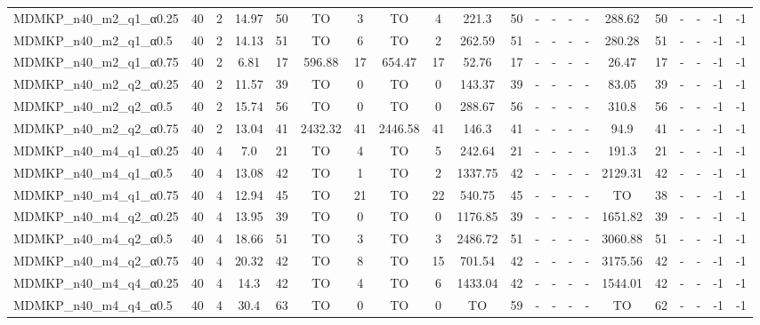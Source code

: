 \begin{sidewaystable}[!ht]
{\begin{tabular}{lcccccccccccccccccccc}
MDMKP\_n40\_m2\_q1\_α0.25 & 40 & 2 &  \textcolor{blue2}{14.97} & 50 & TO & 3 & TO & 4 & 221.3 & 50 &  - &  - &  - &  - & 288.62 & 50 &  - &  - & -1 & -1 \\
MDMKP\_n40\_m2\_q1\_α0.5 & 40 & 2 &  \textcolor{blue2}{14.13} & 51 & TO & 6 & TO & 2 & 262.59 & 51 &  - &  - &  - &  - & 280.28 & 51 &  - &  - & -1 & -1 \\
MDMKP\_n40\_m2\_q1\_α0.75 & 40 & 2 &  \textcolor{blue2}{6.81} & 17 & 596.88 & 17 & 654.47 & 17 & 52.76 & 17 &  - &  - &  - &  - & 26.47 & 17 &  - &  - & -1 & -1 \\
MDMKP\_n40\_m2\_q2\_α0.25 & 40 & 2 &  \textcolor{blue2}{11.57} & 39 & TO & 0 & TO & 0 & 143.37 & 39 &  - &  - &  - &  - & 83.05 & 39 &  - &  - & -1 & -1 \\
MDMKP\_n40\_m2\_q2\_α0.5 & 40 & 2 &  \textcolor{blue2}{15.74} & 56 & TO & 0 & TO & 0 & 288.67 & 56 &  - &  - &  - &  - & 310.8 & 56 &  - &  - & -1 & -1 \\
MDMKP\_n40\_m2\_q2\_α0.75 & 40 & 2 &  \textcolor{blue2}{13.04} & 41 & 2432.32 & 41 & 2446.58 & 41 & 146.3 & 41 &  - &  - &  - &  - & 94.9 & 41 &  - &  - & -1 & -1 \\
MDMKP\_n40\_m4\_q1\_α0.25 & 40 & 4 &  \textcolor{blue2}{7.0} & 21 & TO & 4 & TO & 5 & 242.64 & 21 &  - &  - &  - &  - & 191.3 & 21 &  - &  - & -1 & -1 \\
MDMKP\_n40\_m4\_q1\_α0.5 & 40 & 4 &  \textcolor{blue2}{13.08} & 42 & TO & 1 & TO & 2 & 1337.75 & 42 &  - &  - &  - &  - & 2129.31 & 42 &  - &  - & -1 & -1 \\
MDMKP\_n40\_m4\_q1\_α0.75 & 40 & 4 &  \textcolor{blue2}{12.94} & 45 & TO & 21 & TO & 22 & 540.75 & 45 &  - &  - &  - &  - & TO & 38 &  - &  - & -1 & -1 \\
MDMKP\_n40\_m4\_q2\_α0.25 & 40 & 4 &  \textcolor{blue2}{13.95} & 39 & TO & 0 & TO & 0 & 1176.85 & 39 &  - &  - &  - &  - & 1651.82 & 39 &  - &  - & -1 & -1 \\
MDMKP\_n40\_m4\_q2\_α0.5 & 40 & 4 &  \textcolor{blue2}{18.66} & 51 & TO & 3 & TO & 3 & 2486.72 & 51 &  - &  - &  - &  - & 3060.88 & 51 &  - &  - & -1 & -1 \\
MDMKP\_n40\_m4\_q2\_α0.75 & 40 & 4 &  \textcolor{blue2}{20.32} & 42 & TO & 8 & TO & 15 & 701.54 & 42 &  - &  - &  - &  - & 3175.56 & 42 &  - &  - & -1 & -1 \\
MDMKP\_n40\_m4\_q4\_α0.25 & 40 & 4 &  \textcolor{blue2}{14.3} & 42 & TO & 4 & TO & 6 & 1433.04 & 42 &  - &  - &  - &  - & 1544.01 & 42 &  - &  - & -1 & -1 \\
MDMKP\_n40\_m4\_q4\_α0.5 & 40 & 4 &  \textcolor{blue2}{30.4} & 63 & TO & 0 & TO & 0 & TO & 59 &  - &  - &  - &  - & TO & 62 &  - &  - & -1 & -1 \\

\end{tabular}}
\end{sidewaystable}
